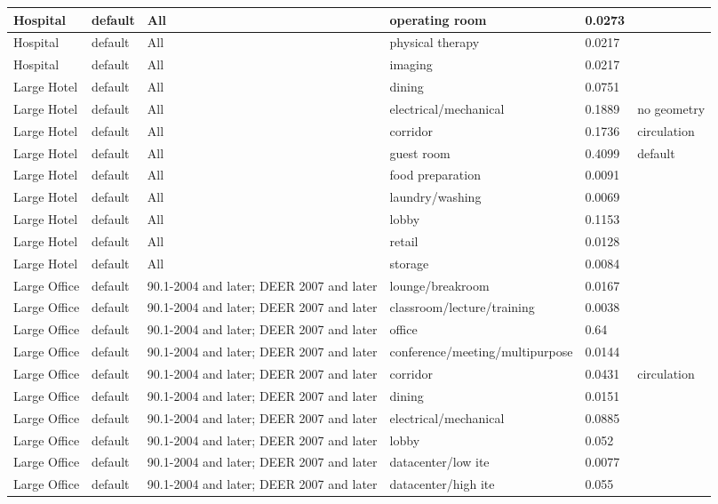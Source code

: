 \begin{center}
\begin{longtable}{|p{1.0in}|p{1.05in}|p{1.1in}|p{1.9in}|p{0.55in}|p{0.95in}|}
Hospital & default & All & operating room & 0.0273 &  \\ \hline
Hospital & default & All & physical therapy & 0.0217 &  \\ \hline
Hospital & default & All & imaging & 0.0217 &  \\ \hline
Large Hotel & default & All & dining & 0.0751 &  \\ \hline
Large Hotel & default & All & electrical/mechanical & 0.1889 & no geometry \\ \hline
Large Hotel & default & All & corridor & 0.1736 & circulation \\ \hline
Large Hotel & default & All & guest room & 0.4099 & default \\ \hline
Large Hotel & default & All & food preparation & 0.0091 &  \\ \hline
Large Hotel & default & All & laundry/washing & 0.0069 &  \\ \hline
Large Hotel & default & All & lobby & 0.1153 &  \\ \hline
Large Hotel & default & All & retail & 0.0128 &  \\ \hline
Large Hotel & default & All & storage & 0.0084 &  \\ \hline
Large Office & default & 90.1-2004 and later; DEER 2007 and later & lounge/breakroom & 0.0167 &  \\ \hline
Large Office & default & 90.1-2004 and later; DEER 2007 and later & classroom/lecture/training & 0.0038 &  \\ \hline
Large Office & default & 90.1-2004 and later; DEER 2007 and later & office & 0.64 &  \\ \hline
Large Office & default & 90.1-2004 and later; DEER 2007 and later & conference/meeting/multipurpose & 0.0144 &  \\ \hline
Large Office & default & 90.1-2004 and later; DEER 2007 and later & corridor & 0.0431 & circulation \\ \hline
Large Office & default & 90.1-2004 and later; DEER 2007 and later & dining & 0.0151 &  \\ \hline
Large Office & default & 90.1-2004 and later; DEER 2007 and later & electrical/mechanical & 0.0885 &  \\ \hline
Large Office & default & 90.1-2004 and later; DEER 2007 and later & lobby & 0.052 &  \\ \hline
Large Office & default & 90.1-2004 and later; DEER 2007 and later & datacenter/low ite & 0.0077 &  \\ \hline
Large Office & default & 90.1-2004 and later; DEER 2007 and later & datacenter/high ite & 0.055 &  \\ \hline

\end{longtable}
\end{center}

